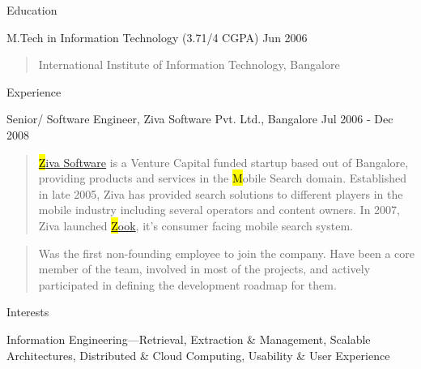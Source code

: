 \documentclass{resume}
\author{Siddhartha Reddy Kothakapu}
\begin{document}
 \maketitle

\begin{category}{Education}{}

    \item {\topic M.Tech in Information Technology}
        {\footnotesize(3.71/4 CGPA)}
        {\period Jun 2006}
        \begin{quote}
            International Institute of Information Technology, Bangalore
        \end{quote}

\end{category}


\begin{category}{Experience}{}

    \item {\topic Senior/ Software Engineer,} Ziva Software Pvt. Ltd., Bangalore
        {\period Jul 2006 - Dec 2008}
        \begin{quote}
            \href{http://www.zook.in/}{{\hl Ziva Software}} is a Venture
            Capital funded startup based out of Bangalore, providing products
            and services in the {\hl Mobile Search} domain.  Established in
            late 2005, Ziva has provided search solutions to different players
            in the mobile industry including several operators and content
            owners. In 2007, Ziva launched \href{http://www.zook.in/}{{\hl
            Zook}}, it's consumer facing mobile search system.
        \end{quote}
        \begin{quote}
            Was the first non-founding employee to join the company. Have been
            a core member of the team, involved in most of the projects, and    %
            actively participated in defining the development roadmap for them.
        \end{quote}

\end{category}


\begin{category}{Interests}{}

    \item Information Engineering---Retrieval, Extraction \&
    Management, Scalable Architectures, Distributed \& Cloud Computing,
    Usability \& User Experience

\end{category}
\end{document}
